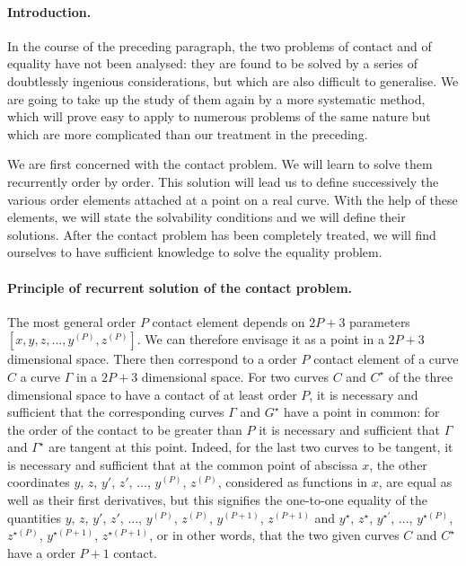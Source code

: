 \documentclass[leqno,11pt]{book}
\numberwithin{equation}{chapter}
\theoremstyle{shape1}
\theoremstyle{shapesmall}
\newcommand{\str}{^{\star}}
\begin{document}
\paragraph{Introduction.}
\label{sec:15}
In the course of the preceding paragraph, the two problems of contact and of equality have not been analysed: they are found to be solved by a series of doubtlessly ingenious considerations, but which are also difficult to generalise. We are going to take up the study of them again by a more systematic method, which will prove easy to apply to numerous problems of the same nature but which are more complicated than our treatment in the preceding.

We are first concerned with the contact problem. We will learn to solve them recurrently order by order. This solution will lead us to define successively the various order elements attached at a point on a real curve. With the help of these elements, we will state the solvability conditions and we will define their solutions. After the contact problem has been completely treated, we will find ourselves to have sufficient knowledge to solve the equality problem.

\paragraph{Principle of recurrent solution of the contact problem.}
\label{sec:16}
The most general order $P$ contact element depends on $2P+3$ parameters $[x,y,z,\dots,y^{(P)},z^{(P)}]$. We can therefore envisage it as a point in a $2P+3$ dimensional space. There then correspond to a order $P$ contact element of a curve $C$ a curve $\Gamma$ in a $2P+3$ dimensional space. For two curves $C$ and $C\str$ of the three dimensional space to have a contact of at least order $P$, it is necessary and sufficient that the corresponding curves $\Gamma$ and $G\str$ have a point in common: for the order of the contact to be greater than $P$ it is necessary and sufficient that $\Gamma$ and $\Gamma\str$ are tangent at this point. Indeed, for the last two curves to be tangent, it is necessary and sufficient that at the common point of abscissa $x$, the other coordinates $y$, $z$, $y'$, $z'$, $\dots$, $y^{(P)}$, $z^{(P)}$, considered as functions in $x$, are equal as well as their first derivatives, but this signifies the one-to-one equality of the quantities $y$, $z$, $y'$, $z'$, $\dots$, $y^{(P)}$, $z^{(P)}$, $y^{(P+1)}$, $z^{(P+1)}$ and $y\str$, $z\str$, $y^{\star\prime}$, $\dots$, $y^{\star(P)}$, $z^{\star(P)}$, $y^{\star(P+1)}$, $z^{\star(P+1)}$, or in other words, that the two given curves $C$ and $C\str$ have a order $P+1$ contact.
\end{document}

